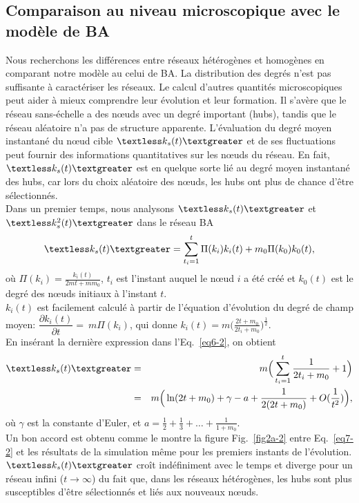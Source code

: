\subsection{Comparaison au niveau microscopique avec le modèle de BA}
 Nous recherchons les différences entre réseaux hétérogènes et homogènes en comparant notre modèle au celui de BA. La distribution des degrés n'est pas suffisante à caractériser les réseaux. Le calcul d'autres quantités microscopiques peut aider à mieux comprendre leur évolution et leur formation. Il s'avère que le réseau sans-échelle a des nœuds avec un degré important (hubs), tandis que le réseau aléatoire n'a pas de structure apparente. L'évaluation du degré moyen instantané du nœud cible $\kms$ et de ses fluctuations peut fournir des informations quantitatives sur les nœuds du réseau. En fait, $\kms$ est en quelque sorte lié au degré moyen instantané des hubs, car lors du choix aléatoire des nœuds, les hubs ont plus de chance d'être sélectionnés. \\  
 Dans un premier temps, nous analysons $\kms$ et $\kmss$ dans le réseau BA
 \begin{eqnarray}
 \kms=\sum_{t_i=1}^t\Pi(k_i)k_i(t)+m_0\Pi(k_0)k_0(t),
 \label{eq6-2}
 \end{eqnarray}
 où  $\Pi(k_i)=\frac{k_i(t)}{2mt+mm_0}$, $t_i$ est l'instant auquel le nœud $ i $ a été créé et $ k_0 (t) $ est le degré des nœuds initiaux à l'instant $t$.\\
 $k_i (t)$ est facilement calculé à partir de l'équation d'évolution du degré de champ moyen:
 $\dfrac{\partial k_i(t)}{\partial t}=~ m\Pi(k_i)$, qui donne $k_i(t)=m\Big(\frac{2t+m_0}{2t_i+m_0}\Big)^{\frac{1}{2}}$.\\
 En insérant la dernière expression dans l'Eq.~\eqref{eq6-2}, on obtient
 \begin{eqnarray}
 \kms&=&m\Big(\sum_{t_i=1}^{t}\dfrac{1}{2t_i+m_0}+1\Big) \\
 &=&m \Big(\ln (2t+m_0)+\gamma-a+\frac{1}{2(2t+m_0)}+O(\frac{1}{t^2})\Big),
 \label{eq7-2}
 \end{eqnarray}
 où $\gamma$ est la constante d'Euler, et $a=\frac{1}{2}+\frac{1}{3}+\ldots+\frac{1}{1+m_0}$.\\
 Un bon accord est obtenu comme le montre la figure Fig.~\ref{fig2a-2} entre Eq.~\eqref{eq7-2} et les résultats de la simulation même pour les premiers instants de l'évolution. $\kms$ croît indéfiniment avec le temps et diverge pour un réseau infini ($t\to\infty$) du fait que, dans les réseaux hétérogènes, les hubs sont plus susceptibles d'être sélectionnés et liés aux nouveaux nœuds. \\
